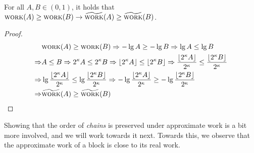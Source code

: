 \begin{lemma}\label{lemma:awork-rounding}
  For all $A, B \in (0, 1)$, it holds that
  $\textsc{work}(A) \geq \textsc{work}(B) \rightarrow \widetilde{\textsc{work}}(A) \geq \widetilde{\textsc{work}}(B)$.
\end{lemma}
\begin{proof}
  \begin{align*}
                &\textsc{work}(A) \geq \textsc{work}(B) \Rightarrow -\lg A \geq -\lg B \Rightarrow \lg A \leq \lg B\\
    \Rightarrow &A \leq B \Rightarrow 2^\kappa A \leq 2^\kappa B \Rightarrow \lfloor 2^\kappa A \rfloor \leq \lfloor 2^\kappa B \rfloor \Rightarrow \frac{\lfloor 2^\kappa A \rfloor}{2^\kappa} \leq \frac{\lfloor 2^\kappa B \rfloor}{2^\kappa}\\
    \Rightarrow &\lg \frac{\lfloor 2^\kappa A \rfloor}{2^\kappa} \leq \lg \frac{\lfloor 2^\kappa B \rfloor}{2^\kappa} \Rightarrow -\lg \frac{\lfloor 2^\kappa A \rfloor}{2^\kappa} \geq -\lg \frac{\lfloor 2^\kappa B \rfloor}{2^\kappa}\\
    \Rightarrow &\widetilde{\textsc{work}}(A) \geq \widetilde{\textsc{work}}(B)
  \end{align*}
  \Qed
\end{proof}

Showing that the order of \emph{chains}
is preserved under approximate work is a bit more involved,
and we will work towards it next.
Towards this, we observe that the approximate work of a block is
close to its real work.

